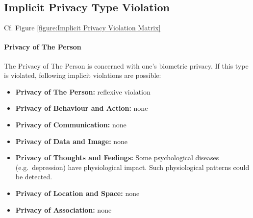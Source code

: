 \subsection{Implicit Privacy Type Violation}

Cf. Figure \ref{figure:Implicit Privacy Violation Matrix}



\paragraph*{Privacy of The Person}

The Privacy of The Person is concerned with one's biometric privacy. 
If this type is violated, following implicit violations are possible:

\begin{itemize}

\item
  \textbf{Privacy of The Person:} reflexive violation
\item
  \textbf{Privacy of Behaviour and Action:} none
\item
  \textbf{Privacy of Communication:} none
\item
  \textbf{Privacy of Data and Image:} none
\item
  \textbf{Privacy of Thoughts and Feelings:} Some psychological diseases
  (e.g.~depression) have physiological impact. Such physiological
  patterns could be detected.
\item
  \textbf{Privacy of Location and Space:} none
\item
  \textbf{Privacy of Association:} none
\end{itemize}

